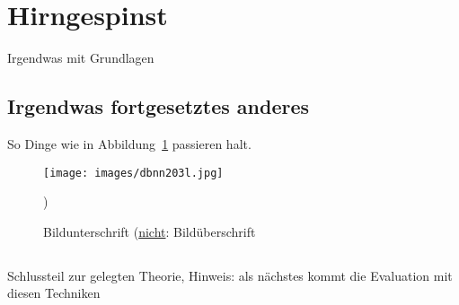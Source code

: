 \section{Hirngespinst}
\label{sec:content}

Irgendwas mit Grundlagen

\subsection{Irgendwas fortgesetztes anderes}

So Dinge wie in Abbildung~\ref{fig:dumb} passieren halt.

\begin{figure}[h!]
	\center
	\texttt{[image: images/dbnn203l.jpg]}
	\caption{Bildunterschrift (\underline{nicht}: Bild\"uberschrift})
	\label{fig:dumb}
\end{figure}

\subsection*{}

Schlussteil zur gelegten Theorie, Hinweis: als n\"achstes kommt die Evaluation mit diesen Techniken

